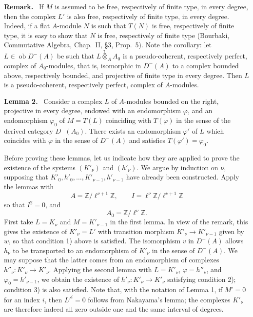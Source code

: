 \documentclass[11pt]{article}
\newenvironment{statement}[1]{\par\medskip\noindent\textbf{#1.}\ }{\par\medskip}
\providecommand{\lten}{\overset{\mathrm L}{\otimes}}
\providecommand{\Ob}{\operatorname{ob}}
\providecommand{\lten}{\overset{\mathrm L}{\otimes}}
\providecommand{\lten}{\overset{\mathrm L}{\otimes}}
\providecommand{\Ob}{\operatorname{ob}}
\providecommand{\lten}{\overset{\mathrm L}{\otimes}}
\providecommand{\lten}{\overset{\mathrm L}{\otimes}}
\providecommand{\Ob}{\operatorname{Ob}}
\providecommand{\lten}{\overset{\mathrm L}{\otimes}}
\providecommand{\Ob}{\operatorname{ob}}
\providecommand{\Ob}{\operatorname{Ob}}
\providecommand{\lten}{\overset{\mathrm L}{\otimes}}
\begin{document}
\begin{statement}{Remark}
If $M$ is assumed to be free, respectively of finite type, in every degree, then the complex $L'$ is also free, respectively of finite type, in every degree. Indeed, if a flat $A$-module $N$ is such that $T(N)$ is free, respectively of finite type, it is easy to show that $N$ is free, respectively of finite type (Bourbaki, Commutative Algebra, Chap.~II, §3, Prop.~5). Note the corollary: let $L\in\Ob D^-(A)$ be such that $L\lten_A A_0$ is a pseudo-coherent, respectively perfect, complex of $A_0$-modules, that is, isomorphic in $D^-(A)$ to a complex bounded above, respectively bounded, and projective of finite type in every degree. Then $L$ is a pseudo-coherent, respectively perfect, complex of $A$-modules.
\end{statement}

\begin{statement}{Lemma 2}
Consider a complex $L$ of $A$-modules bounded on the right, projective in every degree, endowed with an endomorphism $\varphi$, and an endomorphism $\varphi_0$ of $M=T(L)$ coinciding with $T(\varphi)$ in the sense of the derived category $D^-(A_0)$. There exists an endomorphism $\varphi'$ of $L$ which coincides with $\varphi$ in the sense of $D^-(A)$ and satisfies $T(\varphi')=\varphi_0$.
\end{statement}

Before proving these lemmas, let us indicate how they are applied to prove the existence of the systems $(K'_\nu)$ and $(h'_\nu)$. We argue by induction on $\nu$, supposing that $K'_0,h'_0,\ldots,K'_{\nu-1},h'_{\nu-1}$ have already been constructed. Apply the lemmas with
\[
A=\mathbb Z/\ell^{\nu+1}\mathbb Z,
\qquad
I=\ell^\nu\mathbb Z/\ell^{\nu+1}\mathbb Z
\]
so that $I^2=0$, and
\[
A_0=\mathbb Z/\ell^\nu\mathbb Z.
\]
First take $L=K_\nu$ and $M=K'_{\nu-1}$ in the first lemma. In view of the remark, this gives the existence of $K'_\nu=L'$ with transition morphism $K'_\nu\to K'_{\nu-1}$ given by $w$, so that condition 1) above is satisfied. The isomorphism $v$ in $D^-(A)$ allows $h_\nu$ to be transported to an endomorphism of $K'_\nu$ in the sense of $D^-(A)$. We may suppose that the latter comes from an endomorphism of complexes $h''_\nu:K'_\nu\to K'_\nu$. Applying the second lemma with $L=K'_\nu$, $\varphi=h''_\nu$, and $\varphi_0=h'_{\nu-1}$, we obtain the existence of $h'_\nu:K'_\nu\to K'_\nu$ satisfying condition 2); condition 3) is also satisfied. Note that, with the notation of Lemma 1, if $M^i=0$ for an index $i$, then $L'^i=0$ follows from Nakayama's lemma; the complexes $K'_\nu$ are therefore indeed all zero outside one and the same interval of degrees.
\end{document}
